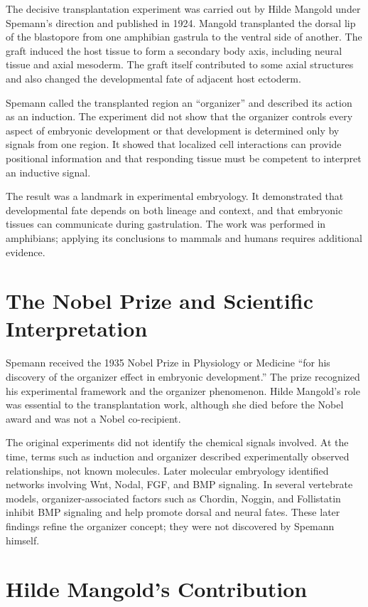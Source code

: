 The decisive transplantation experiment was carried out by Hilde Mangold under Spemann's direction and published in 1924. Mangold transplanted the dorsal lip of the blastopore from one amphibian gastrula to the ventral side of another. The graft induced the host tissue to form a secondary body axis, including neural tissue and axial mesoderm. The graft itself contributed to some axial structures and also changed the developmental fate of adjacent host ectoderm.

Spemann called the transplanted region an ``organizer'' and described its action as an induction. The experiment did not show that the organizer controls every aspect of embryonic development or that development is determined only by signals from one region. It showed that localized cell interactions can provide positional information and that responding tissue must be competent to interpret an inductive signal.

The result was a landmark in experimental embryology. It demonstrated that developmental fate depends on both lineage and context, and that embryonic tissues can communicate during gastrulation. The work was performed in amphibians; applying its conclusions to mammals and humans requires additional evidence.

\section{The Nobel Prize and Scientific Interpretation}

Spemann received the 1935 Nobel Prize in Physiology or Medicine ``for his discovery of the organizer effect in embryonic development.'' The prize recognized his experimental framework and the organizer phenomenon. Hilde Mangold's role was essential to the transplantation work, although she died before the Nobel award and was not a Nobel co-recipient.

The original experiments did not identify the chemical signals involved. At the time, terms such as induction and organizer described experimentally observed relationships, not known molecules. Later molecular embryology identified networks involving Wnt, Nodal, FGF, and BMP signaling. In several vertebrate models, organizer-associated factors such as Chordin, Noggin, and Follistatin inhibit BMP signaling and help promote dorsal and neural fates. These later findings refine the organizer concept; they were not discovered by Spemann himself.

\section{Hilde Mangold's Contribution}

